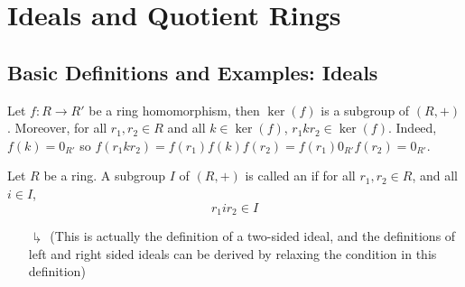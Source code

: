 \chapter{\textsection\textsection Ideals and Quotient Rings}

\section{\textsection Basic Definitions and Examples: Ideals}


\begin{rmk}
    Let $f:R\rightarrow R'$ be a ring homomorphism, then $\ker(f)$ is a subgroup of $(R,+)$. Moreover, for all $r_1,r_2 \in R$ and all $k \in \ker(f)$, $r_1kr_2 \in \ker(f)$. Indeed, $f(k) = 0_{R'}$ so $f(r_1kr_2) = f(r_1)f(k)f(r_2) = f(r_1)0_{R'}f(r_2) = 0_{R'}$.
\end{rmk}

\begin{defn}
    Let $R$ be a ring. A subgroup $I$ of $(R,+)$ is called an  if for all $r_1,r_2 \in R$, and all $i \in I$, \begin{equation}
        r_1ir_2 \in I
    \end{equation}
     \begin{enumerate}
         \item[$\drsh$] (This is actually the definition of a two-sided ideal, and the definitions of left and right sided ideals can be derived by relaxing the condition in this definition) 
     \end{enumerate}
\end{defn}


